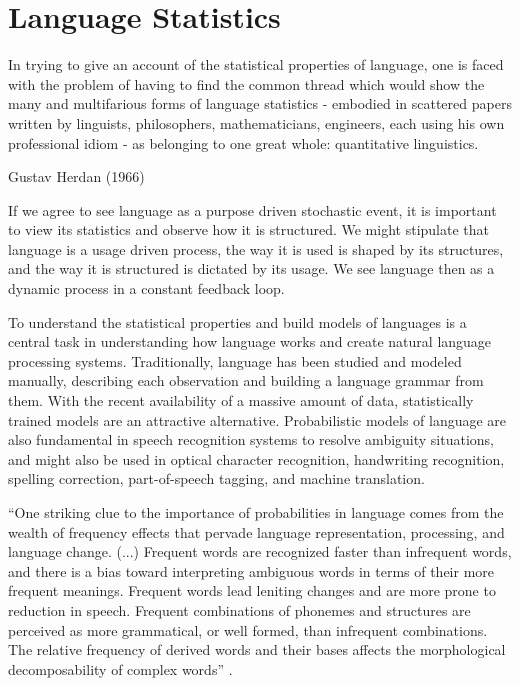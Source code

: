 \chapter{Language Statistics}\label{sec:lang_stat}
\epigraph{In trying to give an account of the statistical properties of language,
one is faced with the problem of having to find the common thread which would
show the many and multifarious forms of language statistics - embodied in scattered
papers written by linguists, philosophers, mathematicians, engineers, each using his 
own professional idiom - as belonging to one great whole: quantitative linguistics.}{Gustav Herdan (1966)}

% 
% 
%
If we agree to see language as a purpose driven stochastic event, 
it is important to view its statistics and observe how it is structured. 
We might stipulate that language is a usage driven process, 
the way it is used is shaped by its structures,
and the way it is structured is dictated by its usage. 
We see language then as a dynamic process in a constant feedback loop.

To understand the statistical properties and build models of languages is a central task in understanding
how language works and create natural language processing systems. Traditionally, language has
been studied and modeled manually, describing each observation and building a language grammar from them.
With the recent availability of a massive amount of data, statistically trained models are an attractive
alternative. Probabilistic models of language are also fundamental in speech recognition systems to
resolve ambiguity situations, and might also be used in optical character recognition, handwriting recognition,
spelling correction, part-of-speech tagging, and machine translation.


``One striking clue to the importance of probabilities in language comes
from the wealth of frequency effects that pervade language representation, processing, and language change.
(...) Frequent words are recognized faster than infrequent words, and there is a bias toward interpreting 
ambiguous words in terms of their more frequent meanings. Frequent words lead leniting changes and 
are more prone to reduction in speech. Frequent combinations of phonemes and structures are perceived as
more grammatical, or well formed, than infrequent combinations. 
The relative frequency of derived words and their bases affects the morphological decomposability of complex words'' 
\citep{bod2003}.


